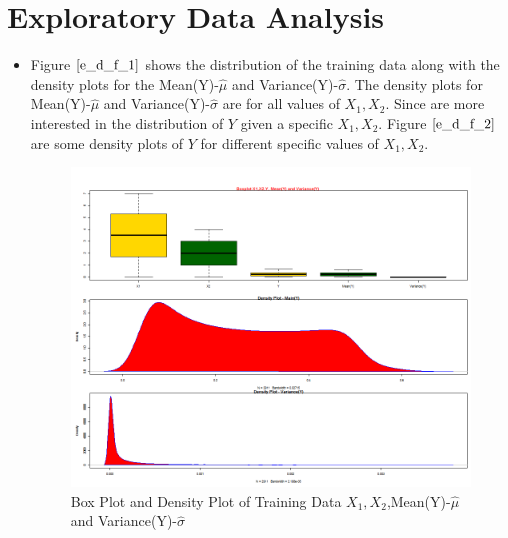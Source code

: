 \documentclass[twoside,12pt]{article}
\begin{document}
\section{Exploratory Data Analysis}
\label{exploratory}
\begin{itemize}

\subsection{Distribution and Density Plots}
\FloatBarrier
\item
Figure $\eqref{e_d_f_1}$ shows the distribution of the training data along with the density plots for the Mean(Y)-$\hat{\mu}$ and Variance(Y)-$\hat{\sigma}$. The density plots for Mean(Y)-$\hat{\mu}$ and Variance(Y)-$\hat{\sigma}$ are for all values of $X_1,X_2$. Since are more interested in the distribution of $Y$ given a specific $X_1,X_2$. Figure $\eqref{e_d_f_2}$ are some density plots of $Y$ for different specific values of $X_1,X_2$.

\begin{figure}[!htbp]
\centering
\includegraphics[scale=.50]{images/mt_train_data_anal_1.png} 
\caption{Box Plot and Density Plot of Training Data $X_1,X_2$,Mean(Y)-$\hat{\mu}$ and Variance(Y)-$\hat{\sigma}$}
\label{e_d_f_1}
\end{figure}


\end{itemize}
\end{document}
